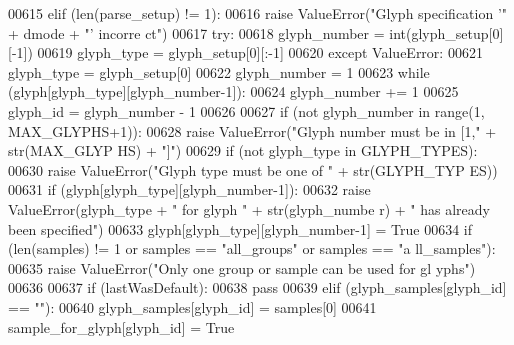 \begin{DoxyCode}
00615                 \textcolor{keywordflow}{elif} (len(parse\_setup) != 1):
00616                     \textcolor{keywordflow}{raise} ValueError(\textcolor{stringliteral}{"Glyph specification '"} + dmode + \textcolor{stringliteral}{"' incorre
      ct"})
00617                 \textcolor{keywordflow}{try}:
00618                     glyph\_number = int(glyph\_setup[0][-1])
00619                     glyph\_type = glyph\_setup[0][:-1]
00620                 \textcolor{keywordflow}{except} ValueError:
00621                     glyph\_type = glyph\_setup[0]
00622                     glyph\_number = 1
00623                     \textcolor{keywordflow}{while} (glyph[glyph\_type][glyph\_number-1]):
00624                         glyph\_number += 1
00625                 glyph\_id = glyph\_number - 1
00626                 
00627                 \textcolor{keywordflow}{if} (\textcolor{keywordflow}{not} glyph\_number \textcolor{keywordflow}{in} range(1, MAX\_GLYPHS+1)):
00628                     \textcolor{keywordflow}{raise} ValueError(\textcolor{stringliteral}{"Glyph number must be in [1,"} + str(MAX\_GLYP
      HS) + \textcolor{stringliteral}{"]"})
00629                 \textcolor{keywordflow}{if} (\textcolor{keywordflow}{not} glyph\_type \textcolor{keywordflow}{in} GLYPH\_TYPES):
00630                     \textcolor{keywordflow}{raise} ValueError(\textcolor{stringliteral}{"Glyph type must be one of "} + str(GLYPH\_TYP
      ES))
00631                 \textcolor{keywordflow}{if} (glyph[glyph\_type][glyph\_number-1]):
00632                     \textcolor{keywordflow}{raise} ValueError(glyph\_type + \textcolor{stringliteral}{" for glyph "} + str(glyph\_numbe
      r) + \textcolor{stringliteral}{" has already been specified"})
00633                 glyph[glyph\_type][glyph\_number-1] = \textcolor{keyword}{True}
00634                 \textcolor{keywordflow}{if} (len(samples) != 1 \textcolor{keywordflow}{or} samples == \textcolor{stringliteral}{"all\_groups"} \textcolor{keywordflow}{or} samples == \textcolor{stringliteral}{"a
      ll\_samples"}):
00635                     \textcolor{keywordflow}{raise} ValueError(\textcolor{stringliteral}{"Only one group or sample can be used for gl
      yphs"})
00636 
00637                 \textcolor{keywordflow}{if} (lastWasDefault):
00638                     \textcolor{keywordflow}{pass}
00639                 \textcolor{keywordflow}{elif} (glyph\_samples[glyph\_id] == \textcolor{stringliteral}{""}):
00640                     glyph\_samples[glyph\_id] = samples[0]
00641                     sample\_for\_glyph[glyph\_id] = \textcolor{keyword}{True}

\end{DoxyCode}
